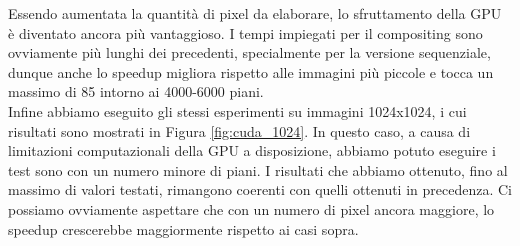 Essendo aumentata la quantità di pixel da elaborare, lo sfruttamento della GPU è diventato ancora più vantaggioso.
I tempi impiegati per il compositing sono ovviamente più lunghi dei precedenti, specialmente per la versione sequenziale,
dunque anche lo speedup migliora rispetto alle immagini più piccole e tocca un massimo di 85 intorno ai 4000-6000 piani.\\

Infine abbiamo eseguito gli stessi esperimenti su immagini 1024x1024, i cui risultati sono mostrati in Figura \ref{fig:cuda_1024}.
In questo caso, a causa di limitazioni computazionali della GPU a disposizione, abbiamo potuto eseguire i test sono con un numero minore di piani.
I risultati che abbiamo ottenuto, fino al massimo di valori testati, rimangono coerenti con quelli ottenuti in precedenza.
Ci possiamo ovviamente aspettare che con un numero di pixel ancora maggiore, lo speedup crescerebbe maggiormente rispetto ai casi sopra.
